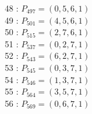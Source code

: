 \documentclass{article}
\begin{document}
{\begin{multicols}{3}
48 : $P_{497}=( 0, 5, 6, 1 )$\\
49 : $P_{501}=( 4, 5, 6, 1 )$\\
50 : $P_{515}=( 2, 7, 6, 1 )$\\
51 : $P_{537}=( 0, 2, 7, 1 )$\\
52 : $P_{543}=( 6, 2, 7, 1 )$\\
53 : $P_{545}=( 0, 3, 7, 1 )$\\
54 : $P_{546}=( 1, 3, 7, 1 )$\\
55 : $P_{564}=( 3, 5, 7, 1 )$\\
56 : $P_{569}=( 0, 6, 7, 1 )$\\
\end{multicols}


%


%


}%
\end{document}
